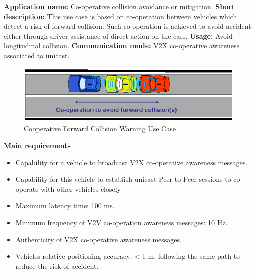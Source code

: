\textbf{Application name:} Co-operative collision avoidance or mitigation.
\textbf{Short description:} This use case is based on co-operation between vehicles which detect a risk of forward collision.
Such co-operation is achieved to avoid accident either through driver assistance of direct action on the cars.
\textbf{Usage:} Avoid longitudinal collision.
\textbf{Communication mode:} V2X co-operative awareness associated to unicast.
\begin{figure}[htbp]
\includegraphics[width=0.99\textwidth]{content/images/06_use_cases/colissionwarning.png}
\caption{Cooperative Forward Collision Warning Use Case\cite{etsi102638}}
\label{fig:cfcw}
\end{figure}
\textbf{Main requirements}
\begin{itemize}
\item Capability for a vehicle to broadcast V2X co-operative awareness messages.
\item Capability for this vehicle to establish unicast Peer to Peer sessions to co-operate with other vehicles closely
\item Maximum latency time: 100 ms.
\item Minimum frequency of V2V co-operation awareness messages: 10 Hz.
\item Authenticity of V2X co-operative awareness messages.
\item Vehicles relative positioning accuracy: < 1 m.
following the same path to reduce the risk of accident.
\end{itemize}

